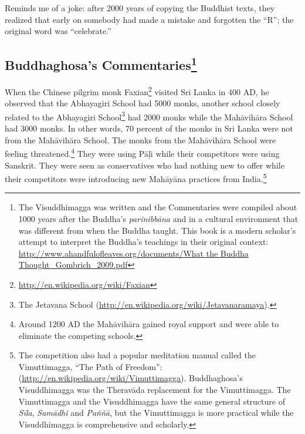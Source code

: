 Reminds me of a joke: after 2000 years of copying the Buddhist texts, they realized that early on somebody had made a mistake and forgotten the “R”; the original word was “celebrate.”

\subsection*{Buddhaghosa’s Commentaries\footnote{The Visuddhimagga was written and the Commentaries were compiled about 1000 years after the Buddha’s \textit{parinibbāna} and in a cultural environment that was different from when the Buddha taught. This book is a modern scholar’s attempt to interpret the Buddha’s teachings in their original context: \url{http://www.ahandfulofleaves.org/documents/What the Buddha Thought_Gombrich_2009.pdf}}}

When the Chinese pilgrim monk Faxian\footnote{\url{http://en.wikipedia.org/wiki/Faxian}} visited Sri Lanka in 400 AD, he observed that the Abhayagiri School had 5000 monks, another school closely related to the Abhayagiri School\footnote{The Jetavana School (\url{http://en.wikipedia.org/wiki/Jetavanaramaya}).} had 2000 monks while the Mahāvihāra School had 3000 monks. In other words, 70 percent of the monks in Sri Lanka were not from the Mahāvihāra School. The monks from the Mahāvihāra School were feeling threatened.\footnote{Around 1200 AD the Mahāvihāra gained royal support and were able to eliminate the competing schools.} They were using Pāḷi while their competitors were using Sanskrit. They were seen as conservatives who had nothing new to offer while their competitors were introducing new Mahāyāna practices from India.\footnote{The competition also had a popular meditation manual called the Vimuttimagga, “The Path of Freedom”: (\url{http://en.wikipedia.org/wiki/Vimuttimagga}). Buddhaghosa’s Visuddhimagga was the Theravāda replacement for the Vimuttimagga. The Vimuttimagga and the Visuddhimagga have the same general structure of \textit{Sīla}, \textit{Samādhi} and \textit{Paññā}, but the Vimuttimagga is more practical while the Visuddhimagga is comprehensive and scholarly.} 

